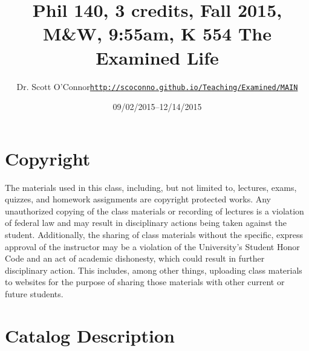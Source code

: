 \documentclass[article,oneside]{memoir}
\def\myauthor{Author}
\def\mytitle{Title}
\def\mycopyright{\myauthor}
\def\myweb{\href{http://scoconno.github.io/Teaching/ExaminedMAIN}{http://scoconno.github.io/Teaching/Examined/MAIN}}
\def\myauthor{Dr. Scott O'Connor}
\def\mytitle{{\normalsize Phil 140, 3 credits, Fall 2015, M\&W, 9:55am, K 554\newline} \HUGE The Examined Life}
\begin{document}
\setsansfont[Mapping=tex-text]{Georgia} 
\setmonofont[Mapping=tex-text,Scale=0.8]{Georgia} 

\def\ind{\hangindent=1 true cm\hangafter=1 \noindent}
\def\labelitemi{$\cdot$}

\pagestyle{kjh}

\title{\LARGE \mytitle}     
\author{\Large\myauthor \newline \footnotesize\texttt{\noindent\myweb}}
\date{09/02/2015--12/14/2015}

\published{\,}

\maketitle




%
%

\section{Copyright}
The materials used in this class, including, but not limited to, lectures, exams, quizzes, and homework assignments are copyright protected works.  Any unauthorized copying of the class materials or recording of lectures is a violation of federal law and may result in disciplinary actions being taken against the student.  Additionally, the sharing of class materials without the specific, express approval of the instructor may be a violation of the University's Student Honor Code and an act of academic dishonesty, which could result in further disciplinary action.  This includes, among other things, uploading class materials to websites for the purpose of sharing those materials with other current or future students. 

\section{Catalog Description}
\end{document}
